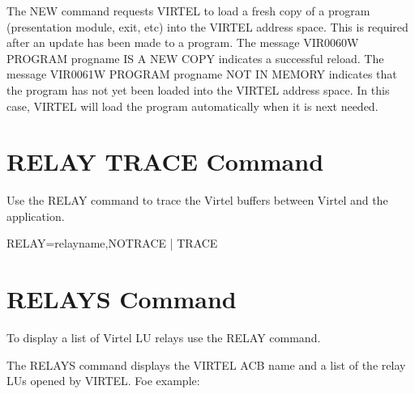 \documentclass[letterpaper,10pt,english]{sphinxmanual}
\begin{document}
\sphinxAtStartPar
The NEW command requests VIRTEL to load a fresh copy of a program  (presentation module, exit, etc) into the VIRTEL address space. This is required after an update has been made to a program. The message     VIR0060W PROGRAM progname IS A NEW COPY indicates a successful reload. The message VIR0061W PROGRAM progname NOT IN MEMORY indicates that the program has not yet been loaded into the VIRTEL address space. In this case, VIRTEL will load the program automatically when it is next needed.

\ignorespaces 

\section{RELAY TRACE Command}
\label{\detokenize{audit_operations_ and_performance:relay-trace-command}}\label{\detokenize{audit_operations_ and_performance:index-16}}
\sphinxAtStartPar
Use the RELAY command to trace the Virtel buffers between Virtel and the application.

\sphinxAtStartPar
RELAY=relayname,NOTRACE | TRACE

\ignorespaces 

\section{RELAYS Command}
\label{\detokenize{audit_operations_ and_performance:relays-command}}\label{\detokenize{audit_operations_ and_performance:index-17}}
\sphinxAtStartPar
To display a list of Virtel LU relays use the RELAY command.

\begin{sphinxVerbatim}[commandchars=\\\{\}]
\end{sphinxVerbatim}

\sphinxAtStartPar
The RELAYS command displays the VIRTEL ACB name and a list of the relay LUs opened by VIRTEL. Foe example:
\end{document}
